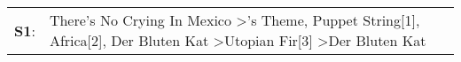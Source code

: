 \begin{supertabular}{p{0.03\textwidth}p{0.92\textwidth}}
 \textbf{S1}:  &  There's No Crying In Mexico\textsuperscript{} \textgreater {}'s Theme\textsuperscript{}, \enspace Puppet String[1]\textsuperscript{}, \enspace Africa[2]\textsuperscript{}, \enspace Der Bluten Kat\textsuperscript{} \textgreater \enspace Utopian Fir[3]\textsuperscript{} \textgreater \enspace Der Bluten Kat\textsuperscript{}  \enspace  \\
\end{supertabular}
